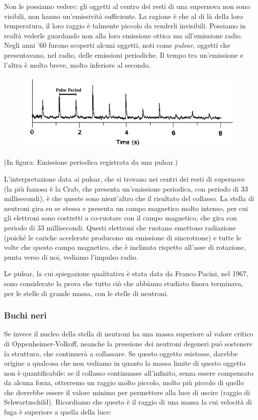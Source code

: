 Non le possiamo vedere: gli oggetti al centro dei resti di una supernova non sono visibili, non hanno un'emissività sufficiente. La ragione è che al di là della loro temperatura, il loro raggio è talmente piccolo da renderli invisibili. Possiamo in realtà vederle guardando non alla loro emissione ottica ma all'emissione radio. Negli anni '60 furono scoperti alcuni oggetti, noti come \textit{pulsar}, oggetti che presentavano, nel radio, delle emissioni periodiche. Il tempo tra un'emissione e l'altra è molto breve, molto inferiore al secondo.

\begin{figure}[H]
    \centering
    \includegraphics[width=12cm]{lezione 28 novembre/emissione periodica.png}
    \label{lezione 28 novembre/emissione periodica.png}
\end{figure}

(In figura: Emissione periodica registrata da una pulsar.)

L'interpretazione data ai pulsar, che si trovano nei centri dei resti di supernove (la più famosa è la Crab, che presenta un'emissione periodica, con periodo di 33 millisecondi), è che queste sono nient'altro che il risultato del collasso. La stella di neutroni gira su se stessa e presenta un campo magnetico molto intenso, per cui gli elettroni sono costretti a co-ruotare con il campo magnetico, che gira con periodo di 33 millisecondi. Questi elettroni che ruotano emettono radiazione (poiché le cariche accelerate producono un emissione di sincrotrone) e tutte le volte che questo campo magnetico, che è inclinato rispetto all'asse di rotazione, punta verso di noi, vediamo l'impulso radio.

Le pulsar, la cui spiegazione qualitativa è stata data da Franco Pacini, nel 1967, sono considerate la prova che tutto ciò che abbiamo studiato finora terminava, per le stelle di grande massa, con le stelle di neutroni.

\subsubsection{Buchi neri}
Se invece il nucleo della stella di neutroni ha una massa superiore al valore critico di Oppenheimer-Volkoff, neanche la pressione dei neutroni degeneri può sostenere la struttura, che continuerà a collassare. Se questo oggetto esistesse, darebbe origine a qualcosa che non vediamo in quanto la massa limite di questo oggetto non è quantificabile: se il collasso continuasse all'infinito, senza essere compensato da alcuna forza, otterremo un raggio molto piccolo, molto più piccolo di quello che dovrebbe essere il valore minimo per permettere alla luce di uscire (raggio di Schwartzschild). Ricordiamo che questo è il raggio di una massa la cui velocità di fuga è superiore a quella della luce:

